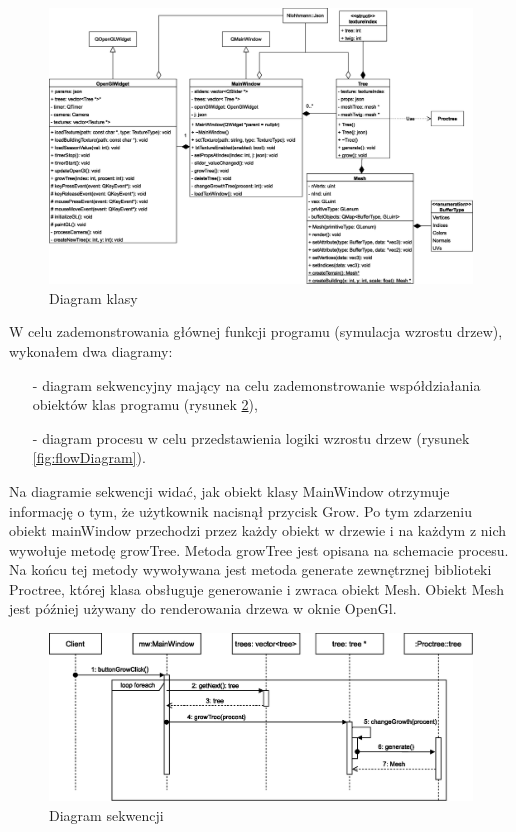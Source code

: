 \documentclass[a4paper,12pt,twoside]{book} %
\begin{document}
\begin{figure}[H]
	\centering\includegraphics[width=15.5cm]{grafika/diagrams/class}
	\caption{Diagram klasy}
    \label{fig:classDiagram}
\end{figure}

W celu zademonstrowania głównej funkcji programu 
(symulacja wzrostu drzew), wykonałem dwa diagramy: 
\begin{itemize}
	\item[-] diagram sekwencyjny mający na celu zademonstrowanie współdziałania obiektów klas programu (rysunek \ref{fig:sequenceDiagram}),
	\item[-] diagram procesu w celu przedstawienia logiki wzrostu drzew (rysunek \ref{fig:flowDiagram}).
\end{itemize}

Na diagramie sekwencji widać, jak obiekt klasy 
MainWindow otrzymuje informację o tym, 
że użytkownik nacisnął przycisk Grow. 
Po tym zdarzeniu obiekt mainWindow przechodzi przez 
każdy obiekt w drzewie i na każdym z nich wywołuje 
metodę growTree. Metoda growTree jest opisana na 
schemacie procesu. Na końcu tej metody wywoływana 
jest metoda generate zewnętrznej biblioteki Proctree, 
której klasa obsługuje generowanie i zwraca obiekt Mesh.
Obiekt Mesh jest później używany do renderowania drzewa 
w oknie OpenGl.

\begin{figure}[H]
	\centering\includegraphics[width=15.5cm]{grafika/diagrams/sequence}
	\caption{Diagram sekwencji}
    \label{fig:sequenceDiagram}
\end{figure}
\end{document}

